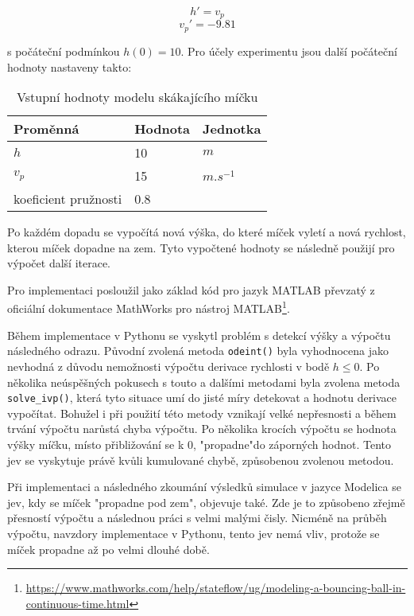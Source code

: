 \begin{equation}
    h' = v_p
\end{equation}
\begin{equation}
    v_p ' = -9.81
\end{equation}

s počáteční podmínkou $h(0) = 10$. Pro účely experimentu jsou další počáteční hodnoty nastaveny takto:

\begin{center}
\begin{table}[ht]
    \centering
\begin{tabular}{|l|l|l|}
\hline
Proměnná             & Hodnota & Jednotka    \\ \hline
$h$                    &   10     & $m$     \\ \hline
$v_p$                   &    15   & $m.s^{-1}$ \\ \hline
koeficient pružnosti &  0.8    &             \\ \hline
\end{tabular}
    \caption{Vstupní hodnoty modelu skákajícího míčku}
    \label{tab:micek-hodnoty}
\end{table}
\end{center}

Po každém dopadu se vypočítá nová výška, do které míček vyletí a nová rychlost, kterou míček dopadne na zem. Tyto vypočtené hodnoty se následně použijí pro výpočet další iterace. 

Pro implementaci posloužil jako základ kód pro jazyk MATLAB převzatý z oficiální dokumentace MathWorks pro nástroj MATLAB\footnote{\url{https://www.mathworks.com/help/stateflow/ug/modeling-a-bouncing-ball-in-continuous-time.html}}.

Během implementace v Pythonu se vyskytl problém s detekcí výšky a výpočtu následného odrazu. Původní zvolená metoda \texttt{odeint()} byla vyhodnocena jako nevhodná z důvodu nemožnosti výpočtu derivace rychlosti v bodě $h\leq0$. Po několika neúspěšných pokusech s touto a dalšími metodami byla zvolena metoda \texttt{solve\_ivp()}, která tyto situace umí do jisté míry detekovat a hodnotu derivace vypočítat. Bohužel i při použití této metody vznikají velké nepřesnosti a během trvání výpočtu narůstá chyba výpočtu. Po několika krocích výpočtu se hodnota výšky míčku, místo přibližování se k 0, "propadne"\space do záporných hodnot. Tento jev se vyskytuje právě kvůli kumulované chybě, způsobenou zvolenou metodou.

Při implementaci a následného zkoumání výsledků simulace v jazyce Modelica se jev, kdy se míček "propadne pod zem", objevuje také. Zde je to způsobeno zřejmě přesností výpočtu a následnou práci s velmi malými čisly. Nicméně na průběh výpočtu, navzdory implementace v Pythonu, tento jev nemá vliv, protože se míček propadne až po velmi dlouhé době.

